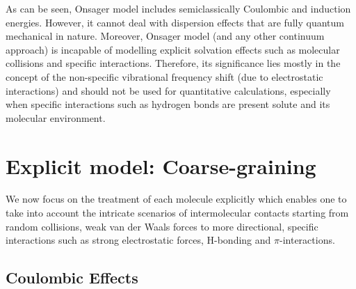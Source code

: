 \documentclass[a4paper,titlepage,twoside,fleqn,12pt]{book}
\begin{document}
\begin{refsection}
As can be seen, Onsager model includes semiclassically
Coulombic and induction energies. However, it cannot
deal with dispersion effects that are fully quantum mechanical
in nature. Moreover,
Onsager model (and any other continuum approach) 
is incapable of modelling
explicit solvation effects such as molecular collisions
and specific interactions. Therefore, its significance
lies mostly in the concept of the non\hyp{}specific
vibrational frequency shift (due to electrostatic
interactions) and should not be used for quantitative
calculations, especially when specific interactions such as
hydrogen bonds are present solute and its molecular environment.


\section{Explicit model: Coarse-graining}

We now focus on the treatment of each molecule
explicitly which enables one to take into account
the intricate scenarios of intermolecular contacts
starting from random collisions, weak van der Waals
forces to more directional, specific interactions
such as strong electrostatic forces, H-bonding and
$\pi$-interactions.

\subsection{Coulombic Effects\label{s:dw-coul}}


\end{refsection}
\end{document}
